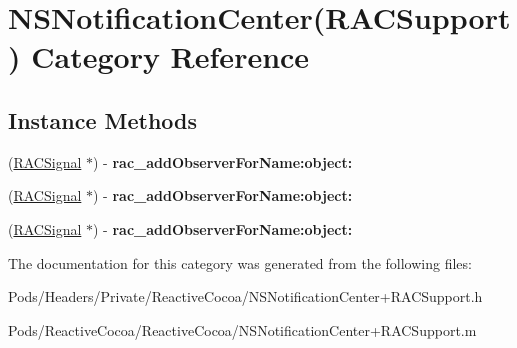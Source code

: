 \hypertarget{category_n_s_notification_center_07_r_a_c_support_08}{}\section{N\+S\+Notification\+Center(R\+A\+C\+Support) Category Reference}
\label{category_n_s_notification_center_07_r_a_c_support_08}
\subsection*{Instance Methods}
\begin{DoxyCompactItemize}
\item 
\mbox{\label{category_n_s_notification_center_07_r_a_c_support_08_abbb59d81242d6afb86e7885bc6c56da4}} 
(\mbox{\hyperlink{interface_r_a_c_signal}{R\+A\+C\+Signal}} $\ast$) -\/ {\bfseries rac\+\_\+add\+Observer\+For\+Name\+:object\+:}
\item 
\mbox{\label{category_n_s_notification_center_07_r_a_c_support_08_abbb59d81242d6afb86e7885bc6c56da4}} 
(\mbox{\hyperlink{interface_r_a_c_signal}{R\+A\+C\+Signal}} $\ast$) -\/ {\bfseries rac\+\_\+add\+Observer\+For\+Name\+:object\+:}
\item 
\mbox{\label{category_n_s_notification_center_07_r_a_c_support_08_abbb59d81242d6afb86e7885bc6c56da4}} 
(\mbox{\hyperlink{interface_r_a_c_signal}{R\+A\+C\+Signal}} $\ast$) -\/ {\bfseries rac\+\_\+add\+Observer\+For\+Name\+:object\+:}
\end{DoxyCompactItemize}


The documentation for this category was generated from the following files\+:\begin{DoxyCompactItemize}
\item 
Pods/\+Headers/\+Private/\+Reactive\+Cocoa/N\+S\+Notification\+Center+\+R\+A\+C\+Support.\+h\item 
Pods/\+Reactive\+Cocoa/\+Reactive\+Cocoa/N\+S\+Notification\+Center+\+R\+A\+C\+Support.\+m\end{DoxyCompactItemize}
